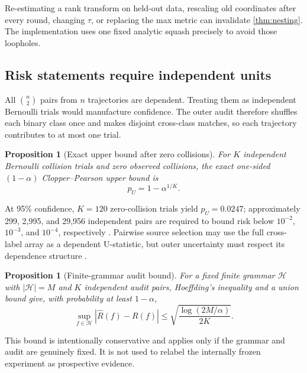 \documentclass[10pt]{article}
\newtheorem{proposition}[theorem]{Proposition}
\theoremstyle{definition}
\theoremstyle{remark}
\newcommand{\cH}{\mathcal H}
\begin{document}
Re-estimating a rank transform on held-out data, rescaling old coordinates after every round, changing $\tau$, or replacing the max metric can invalidate \cref{thm:nesting}. The implementation uses one fixed analytic squash precisely to avoid those loopholes.

\subsection{Risk statements require independent units}

All $\binom n2$ pairs from $n$ trajectories are dependent. Treating them as independent Bernoulli trials would manufacture confidence. The outer audit therefore shuffles each binary class once and makes disjoint cross-class matches, so each trajectory contributes to at most one trial.

\begin{proposition}[Exact upper bound after zero collisions]
\label{prop:zero-bound}
For $K$ independent Bernoulli collision trials and zero observed collisions, the exact one-sided $(1-\alpha)$ Clopper--Pearson upper bound is
\begin{equation}
  p_U=1-\alpha^{1/K}.
  \label{eq:cp}
\end{equation}
\end{proposition}

At 95\% confidence, $K=120$ zero-collision trials yield $p_U=0.0247$; approximately 299, 2,995, and 29,956 independent pairs are required to bound risk below $10^{-2}$, $10^{-3}$, and $10^{-4}$, respectively \citep{ClopperPearson1934}. Pairwise source selection may use the full cross-label array as a dependent U-statistic, but outer uncertainty must respect its dependence structure \citep{Hoeffding1948}.

\begin{proposition}[Finite-grammar audit bound]
\label{prop:grammar-bound}
For a fixed finite grammar $\cH$ with $|\cH|=M$ and $K$ independent audit pairs, Hoeffding's inequality and a union bound give, with probability at least $1-\alpha$,
\begin{equation}
  \sup_{f\in\cH}|\widehat R(f)-R(f)|
  \le
  \sqrt{\frac{\log(2M/\alpha)}{2K}}.
  \label{eq:finite-bound}
\end{equation}
\end{proposition}

This bound is intentionally conservative and applies only if the grammar and audit are genuinely fixed. It is not used to relabel the internally frozen experiment as prospective evidence.
\end{document}

